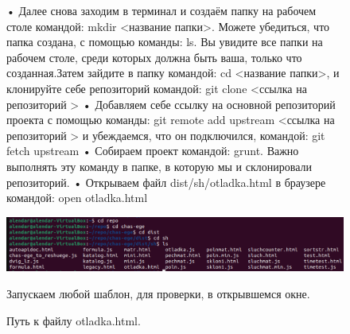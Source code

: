 \begin{figure}
• Далее снова заходим в терминал и создаём папку на рабочем столе командой: mkdir <название папки>. Можете убедиться, что папка создана, с помощью команды: ls. Вы увидите все папки на рабочем столе, среди которых должна быть ваша, только что созданная.Затем зайдите в папку командой: cd <название папки>, и клонируйте себе репозиторий командой: git clone <ссылка на репозиторий >
  \newline   • Добавляем себе ссылку на основной репозиторий проекта с помощью команды: git remote add upstream <ссылка на репозиторий > и убеждаемся, что он подключился, командой: git fetch upstream
   \newline  • Собираем проект командой: grunt. Важно выполнять эту команду в папке, в которую мы и склонировали репозиторий.
  \newline  • Открываем файл dist/sh/otladka.html в браузере командой: open otladka.html


		\includegraphics[width=1\linewidth]{img/7.png}
\caption{Путь к файлу otladka.html.}
\label{ris:image}
\quad Запускаем любой шаблон, для проверки, в открывшемся окне.
\end{figure}
